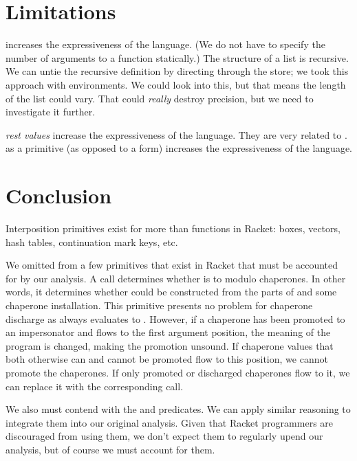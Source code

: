 \documentclass{sigplanconf}
\begin{document}
\section{Limitations}

 increases the expressiveness of the language.
(We do not have to specify the number of arguments to a function statically.)
The structure of a list is recursive.
We can untie the recursive definition by directing through the store; we took this approach with environments.
We could look into this, but that means the length of the list could vary.
That could \emph{really} destroy precision, but we need to investigate it further.

\emph{rest values} increase the expressiveness of the language. They are very related to .
 as a primitive (as opposed to a form) increases the expressiveness of the language.

\section{Conclusion}

Interposition primitives exist for more than functions in Racket: boxes, vectors, hash tables, continuation mark keys, etc.

We omitted from \chapcalc a few primitives that exist in Racket that must be accounted for by our analysis.
A call  determines whether  is  to  modulo chaperones.
In other words, it determines whether  could be constructed from the parts of  and some chaperone installation.
This primitive presents no problem for chaperone discharge as  always evaluates to .
However, if a chaperone has been promoted to an impersonator and flows to the first argument position, the meaning of the program is changed, making the promotion unsound.
If chaperone values that both otherwise can and cannot be promoted flow to this position, we cannot promote the chaperones.
If only promoted or discharged chaperones flow to it, we can replace it with the corresponding  call.

We also must contend with the  and  predicates. We can apply similar reasoning to integrate them into our original analysis.
Given that Racket programmers are discouraged from using them, we don't expect them to regularly upend our analysis, but of course we must account for them.
\end{document}
